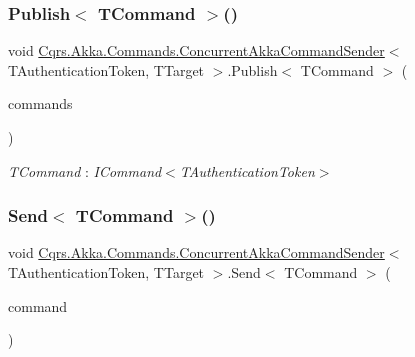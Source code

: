 \subsubsection{\texorpdfstring{Publish$<$ T\+Command $>$()}{Publish< TCommand >()}\hspace{0.1cm}{\footnotesize\ttfamily [2/2]}}
{\footnotesize\ttfamily void \hyperlink{classCqrs_1_1Akka_1_1Commands_1_1ConcurrentAkkaCommandSender}{Cqrs.\+Akka.\+Commands.\+Concurrent\+Akka\+Command\+Sender}$<$ T\+Authentication\+Token, T\+Target $>$.Publish$<$ T\+Command $>$ (\begin{DoxyParamCaption}\item[{I\+Enumerable$<$ T\+Command $>$}]{commands }\end{DoxyParamCaption})}

\begin{Desc}
\item[Type Constraints]\begin{description}
\item[{\em T\+Command} : {\em I\+Command$<$T\+Authentication\+Token$>$}]\end{description}
\end{Desc}
\mbox{\label{classCqrs_1_1Akka_1_1Commands_1_1ConcurrentAkkaCommandSender_a46b88bf730db4a530586737d699e1f12}} 
\subsubsection{\texorpdfstring{Send$<$ T\+Command $>$()}{Send< TCommand >()}\hspace{0.1cm}{\footnotesize\ttfamily [1/2]}}
{\footnotesize\ttfamily void \hyperlink{classCqrs_1_1Akka_1_1Commands_1_1ConcurrentAkkaCommandSender}{Cqrs.\+Akka.\+Commands.\+Concurrent\+Akka\+Command\+Sender}$<$ T\+Authentication\+Token, T\+Target $>$.Send$<$ T\+Command $>$ (\begin{DoxyParamCaption}\item[{T\+Command}]{command }\end{DoxyParamCaption})}

